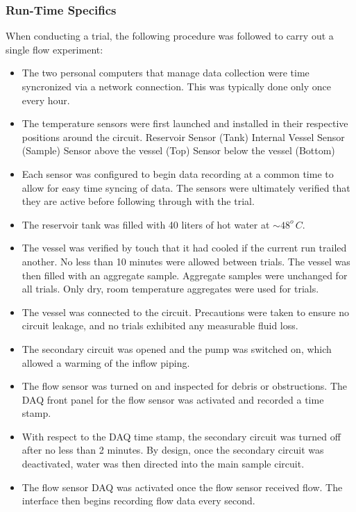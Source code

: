 \subsubsection*{Run-Time Specifics}

When conducting a trial, the following procedure was followed to carry out a single flow experiment:

\begin{itemize}
 \item The two personal computers that manage data collection were time syncronized via a network connection. This was typically  done only once every hour. 
\pagebreak
 \item The temperature sensors were first launched and installed in their respective positions around the circuit.
	\subitem Reservoir Sensor (Tank)
        \subitem Internal Vessel Sensor (Sample)
	\subitem Sensor above the vessel (Top)
        \subitem Sensor below the vessel (Bottom)
\pagebreak
 \item Each sensor was configured to begin data recording at a common time to allow for easy time syncing of data. The sensors were ultimately verified that they are active before following through with the trial.
 \item The reservoir tank was filled with 40 liters of hot water at $\sim48^{o}\,C$.
 \item The vessel was verified by touch that it had cooled if the current run trailed another. No less than 10 minutes were allowed between trials. The vessel was then filled with an aggregate sample. Aggregate samples were unchanged for all trials. Only dry, room temperature aggregates were used for trials.
 \item The vessel was connected to the circuit. Precautions were taken to ensure no circuit leakage, and no trials exhibited any measurable fluid loss.
 \item The secondary circuit was opened and the pump was switched on, which allowed a warming of the inflow piping. 
 \item The flow sensor was turned on and inspected for debris or obstructions. The DAQ front panel for the flow sensor was activated and recorded a time stamp.
 \item With respect to the DAQ time stamp, the secondary circuit was turned off after no less than 2 minutes. By design, once the secondary circuit was deactivated, water was then directed into the main sample circuit. 
 \item The flow sensor DAQ was activated once the flow sensor received flow. The interface then begins recording flow data every second.

\end{itemize}
